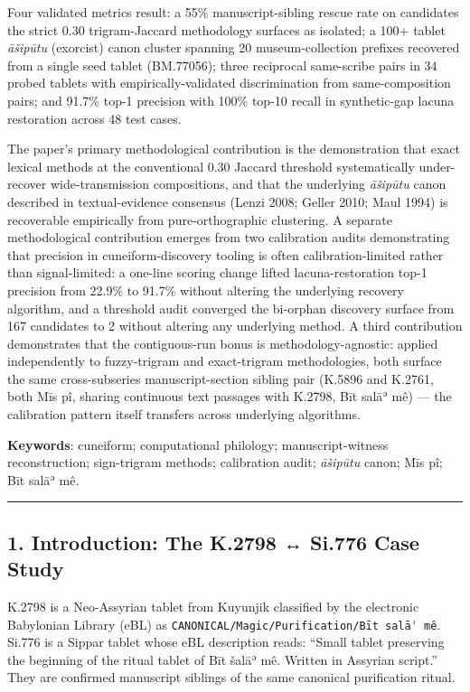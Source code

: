 \documentclass[
  11pt,
  letterpaper,
]{article}
\begin{document}
Four validated metrics result: a 55\% manuscript-sibling rescue rate on
candidates the strict 0.30 trigram-Jaccard methodology surfaces as
isolated; a 100+ tablet \emph{āšipūtu} (exorcist) canon cluster spanning
20 museum-collection prefixes recovered from a single seed tablet
(BM.77056); three reciprocal same-scribe pairs in 34 probed tablets with
empirically-validated discrimination from same-composition pairs; and
91.7\% top-1 precision with 100\% top-10 recall in synthetic-gap lacuna
restoration across 48 test cases.

The paper's primary methodological contribution is the demonstration
that exact lexical methods at the conventional 0.30 Jaccard threshold
systematically under-recover wide-transmission compositions, and that
the underlying \emph{āšipūtu} canon described in textual-evidence
consensus (Lenzi 2008; Geller 2010; Maul 1994) is recoverable
empirically from pure-orthographic clustering. A separate methodological
contribution emerges from two calibration audits demonstrating that
precision in cuneiform-discovery tooling is often calibration-limited
rather than signal-limited: a one-line scoring change lifted
lacuna-restoration top-1 precision from 22.9\% to 91.7\% without
altering the underlying recovery algorithm, and a threshold audit
converged the bi-orphan discovery surface from 167 candidates to 2
without altering any underlying method. A third contribution
demonstrates that the contiguous-run bonus is methodology-agnostic:
applied independently to fuzzy-trigram and exact-trigram methodologies,
both surface the same cross-subseries manuscript-section sibling pair
(K.5896 and K.2761, both Mīs pî, sharing continuous text passages with
K.2798, Bīt salāʾ mê) --- the calibration pattern itself transfers
across underlying algorithms.

\textbf{Keywords}: cuneiform; computational philology;
manuscript-witness reconstruction; sign-trigram methods; calibration
audit; \emph{āšipūtu} canon; Mīs pî; Bīt salāʾ mê.

\begin{center}\rule{0.5\linewidth}{0.5pt}\end{center}

\subsection{1. Introduction: The K.2798 ↔ Si.776 Case
Study}\label{introduction-the-k.2798-si.776-case-study}

K.2798 is a Neo-Assyrian tablet from Kuyunjik classified by the
electronic Babylonian Library (eBL) as
\texttt{CANONICAL/Magic/Purification/Bīt\ salāʾ\ mê}. Si.776 is a Sippar
tablet whose eBL description reads: ``Small tablet preserving the
beginning of the ritual tablet of Bīt šalāʾ mê. Written in Assyrian
script.'' They are confirmed manuscript siblings of the same canonical
purification ritual.
\end{document}
